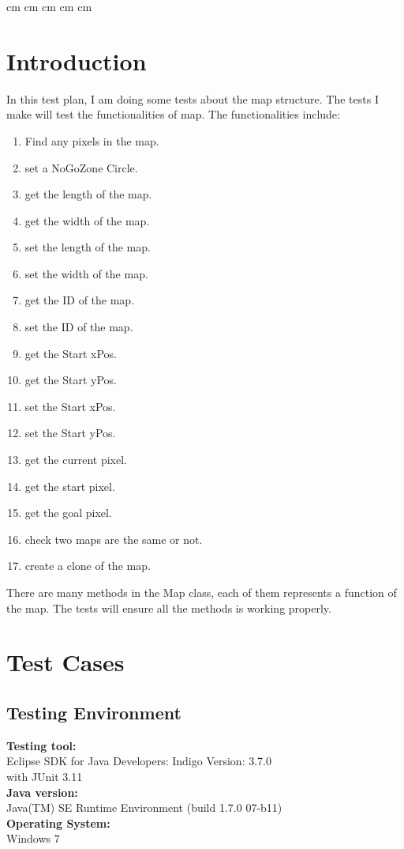 \documentclass[12pt, a4paper]{report}
\begin{document}
 cm
 cm
 cm
 cm
 cm

\tableofcontents


\clearpage


\chapter{Introduction}
\label{cha:I}
In this test plan, I am doing some tests about the map structure. The tests I make will test the functionalities of map. The functionalities include:
\begin{enumerate}
	\item  Find any pixels in the map.
	\item  set a NoGoZone Circle.
	\item  get the length of the map.
	\item  get the width of the map.
	\item  set the length of the map.
	\item  set the width of the map.
	\item  get the ID of the map.
	\item  set the ID of the map.
	\item  get the Start xPos.
	\item  get the Start yPos.
	\item  set the Start xPos.
	\item  set the Start yPos.
	\item  get the current pixel.
	\item  get the start pixel.
	\item  get the goal pixel.
	\item  check two maps are the same or not.
	\item  create a clone of the map.	
\end{enumerate}
There are many methods in the Map class, each of them represents a function of the map. The tests will ensure all the methods is working properly.


\chapter{Test Cases} %
\label{cha:T}

\section{Testing Environment}
\textbf{Testing tool: } \\
Eclipse SDK for Java Developers: Indigo Version: 3.7.0
\\with JUnit 3.11\\
\textbf{Java version: }\\
Java(TM) SE Runtime Environment (build 1.7.0 07-b11)\\
\textbf{Operating System: }\\
Windows 7\\
\end{document}
